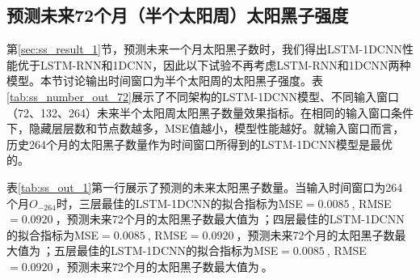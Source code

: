 \subsection{预测未来72个月（半个太阳周）太阳黑子强度}\label{sec:ss_result_72}

第\ref{sec:ss_result_1}节，预测未来一个月太阳黑子数时，我们得出LSTM-1DCNN性能优于LSTM-RNN和1DCNN，因此以下试验不再考虑LSTM-RNN和1DCNN两种模型。本节讨论输出时间窗口为半个太阳周的太阳黑子强度。表\ref{tab:ss_number_out_72}展示了不同架构的LSTM-1DCNN模型、不同输入窗口（72、132、264）未来半个太阳周太阳黑子数量效果指标。在相同的输入窗口条件下，隐藏层层数和节点数越多，MSE值越小，模型性能越好。就输入窗口而言，历史264个月的太阳黑子数量作为时间窗口所得到的LSTM-1DCNN模型是最优的。


表\ref{tab:ss_out_1}第一行展示了预测的未来太阳黑子数量。当输入时间窗口为264个月$O_{-264}$时，三层最佳的LSTM-1DCNN的拟合指标为MSE$=\SI{0.0085}{}$, RMSE$=\SI{0.0920}{}$，预测未来72个月的太阳黑子数最大值为$\SI{}{}$；四层最佳的LSTM-1DCNN的拟合指标为MSE$=\SI{0.0085}{}$, RMSE$=\SI{0.0920}{}$，预测未来72个月的太阳黑子数最大值为$\SI{}{}$；五层最佳的LSTM-1DCNN的拟合指标为MSE$=\SI{0.0085}{}$, RMSE$=\SI{0.0920}{}$，预测未来72个月的太阳黑子数最大值为$\SI{}{}$。

